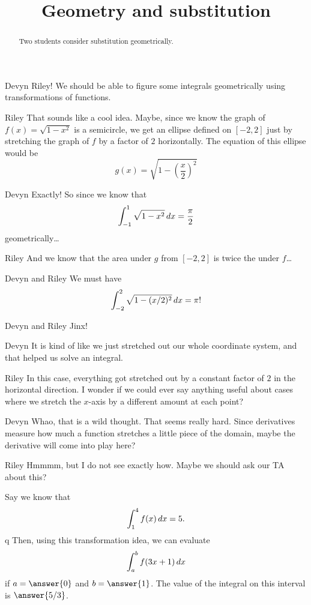 \documentclass{ximera}
\title[Break-Ground:]{Geometry and substitution}
\begin{document}
\begin{abstract}
Two students consider substitution geometrically.
\end{abstract}
\maketitle

\begin{dialogue}
\item[Devyn] Riley! We should be able to figure some integrals
  geometrically using transformations of functions.
\item[Riley] That sounds like a cool idea.  Maybe, since we know the
  graph of $f(x) = \sqrt{1-x^2}$ is a semicircle, we get an ellipse
  defined on $[-2,2]$ just by stretching the graph of $f$ by a factor
  of $2$ horizontally.  The equation of this ellipse would be
  \[
  g(x) =\sqrt{1-(\frac{x}{2})^2}
  \]
\item[Devyn] Exactly!  So since we know that
  \[
  \int_{-1}^1 \sqrt{1-x^2} \,d x = \frac{\pi}{2}
  \]
  geometrically\dots
\item[Riley] And we know that the area under $g$ from $[-2,2]$ is
  twice the under $f$\dots
\item[Devyn and Riley] We must have
  \[
  \int_{-2}^2 \sqrt{1-(x/2)^2} \,d x =\pi !
  \]
\item[Devyn and Riley] Jinx!
\item[Devyn] It is kind of like we just stretched out our whole
  coordinate system, and that helped us solve an integral.
\item[Riley] In this case, everything got stretched out by a constant
  factor of $2$ in the horizontal direction.  I wonder if we could
  ever say anything useful about cases where we stretch the $x$-axis
  by a different amount at each point?
\item[Devyn] Whao, that is a wild thought.  That seems really hard.
  Since derivatives measure how much a function stretches a little
  piece of the domain, maybe the derivative will come into play here?
\item[Riley] Hmmmm, but I do not see exactly how.  Maybe we should ask
  our TA about this?
\end{dialogue}


\begin{problem}
  Say we know that
  \[
  \int_1^4 f(x) \,d x = 5.
  \]q
  Then, using this
transformation idea, we can evaluate
\[
\int_a^b f(3x+1)\,d x
\]
if $a= \answer{0}$ and $b=\answer{1}$.  The value of the integral on
this interval is $\answer{5/3}$.
\end{problem}


\end{document}
